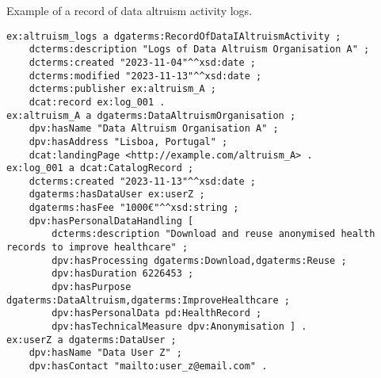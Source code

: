 \begin{listing}[ht]
\caption{Example of a record of data altruism activity logs.}
\label{list:activity_log}
\begin{verbatim}
ex:altruism_logs a dgaterms:RecordOfDataIAltruismActivity ;
    dcterms:description "Logs of Data Altruism Organisation A" ;
    dcterms:created "2023-11-04"^^xsd:date ; 
    dcterms:modified "2023-11-13"^^xsd:date ;
    dcterms:publisher ex:altruism_A ;
    dcat:record ex:log_001 .
ex:altruism_A a dgaterms:DataAltruismOrganisation ;
    dpv:hasName "Data Altruism Organisation A" ;
    dpv:hasAddress "Lisboa, Portugal" ;
    dcat:landingPage <http://example.com/altruism_A> .
ex:log_001 a dcat:CatalogRecord ;
    dcterms:created "2023-11-13"^^xsd:date ;
    dgaterms:hasDataUser ex:userZ ;
    dgaterms:hasFee "1000€"^^xsd:string ;
    dpv:hasPersonalDataHandling [
        dcterms:description "Download and reuse anonymised health records to improve healthcare" ;
        dpv:hasProcessing dgaterms:Download,dgaterms:Reuse ;
        dpv:hasDuration 6226453 ;
        dpv:hasPurpose dgaterms:DataAltruism,dgaterms:ImproveHealthcare ;
        dpv:hasPersonalData pd:HealthRecord ;
        dpv:hasTechnicalMeasure dpv:Anonymisation ] .
ex:userZ a dgaterms:DataUser ;
    dpv:hasName "Data User Z" ;
    dpv:hasContact "mailto:user_z@email.com" .
\end{verbatim}
\end{listing}


